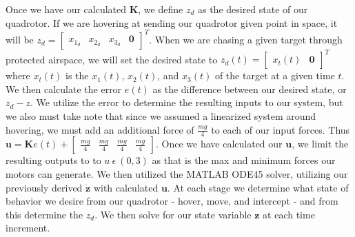 \documentclass{article}
\begin{document}
\begin{multicols}{2}
Once we have our calculated $\boldsymbol{K}$, we define $z_d$ as the desired state of our quadrotor. If we are hovering at sending 
our quadrotor given point in space, it will be $z_d=\begin{bmatrix} x_{1_d} & x_{2_d} & x_{3_d} & \boldsymbol{0} 
\end{bmatrix}^T$. When we are chasing a given target through protected airspace, we will set the desired state to 
$z_d(t)=\begin{bmatrix} x_t(t) & \boldsymbol{0} \end{bmatrix}^T$ where $x_t(t)$ is the $x_1(t)$, $x_2(t)$, and $x_3(t)$ of the target at a given 
time $t$. We then calculate the error $e(t)$ as the difference between our desired state, or $z_d - z$. We utilize the error to 
determine the resulting inputs to our system, but we also must take note that since we assumed a linearized system around 
hovering, we must add an additional force of $\frac{mg}{4}$ to each of our input forces. Thus $\boldsymbol{u}= \boldsymbol{K}e(t) + 
\begin{bmatrix}\frac{mg}{4} & \frac{mg}{4} & \frac{mg}{4} & \frac{mg}{4}\end{bmatrix}$. 
Once we have calculated our $\boldsymbol{u}$, we limit the resulting outputs to to $u\  \epsilon\  (0, 3)$ as that is the max and 
minimum forces our motors can generate.
We then utilized the MATLAB ODE45 solver, utilizing our previously derived $\boldsymbol{\dot{z}}$ with calculated $
\boldsymbol{u}$. At each stage we determine what state of behavior we desire from our quadrotor - hover, move, and intercept - 
and from this determine the $z_d$. We then solve for our state variable $\boldsymbol{z}$ at each time increment.

\end{multicols}
\end{document}
